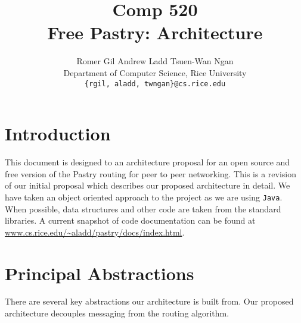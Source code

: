 \documentclass{article}
\title{Comp 520\\Free Pastry: Architecture}
\author{Romer Gil \hspace{8mm} Andrew Ladd \hspace{8mm} Tsuen-Wan Ngan\\
	\normalsize Department of Computer Science, Rice University\\
	\small \tt \{rgil, aladd, twngan\}@cs.rice.edu}
\date{}
\begin{document}
\maketitle

\section*{Introduction}

This document is designed to an architecture proposal for an open
source and free version of the Pastry routing for peer to peer
networking.  This is a revision of our initial proposal which
describes our proposed architecture in detail.  We have taken an
object oriented approach to the project as we are using {\tt Java}.  When
possible, data structures and other code are taken from the standard
libraries.  A current snapshot of code documentation can be found at
\url{www.cs.rice.edu/~aladd/pastry/docs/index.html}.

\section*{Principal Abstractions}

There are several key abstractions our architecture is built from.
Our proposed architecture decouples messaging from the routing
algorithm.
\end{document}

